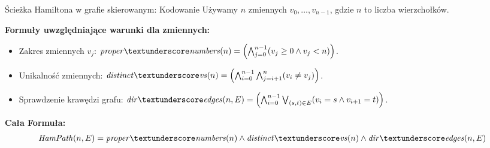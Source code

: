 \begin{frame}{Ścieżka Hamiltona w grafie skierowanym: Kodowanie}
Używamy $n$ zmiennych $v_0,…,v_{n−1}$, gdzie $n$ to liczba wierzchołków.
\vspace{10pt}

\textbf{Formuły uwzględniające warunki dla zmiennych:}
\vspace{5pt}
\begin{itemize}
	\item Zakres zmiennych $v_j$: $\propernumbers(n) = \left( \bigwedge_{j=0}^{n-1} (v_j \geq 0 \land v_j < n) \right) $.
	\item Unikalność zmiennych: $\distinctvs(n) = \left( \bigwedge_{i=0}^{n-1} \bigwedge_{j=i+1}^{n} (v_i \neq v_j) \right)$.
	\item Sprawdzenie krawędzi grafu: $\diredges(n,E) = \left( \bigwedge_{i=0}^{n-1} \bigvee_{(s,t) \in E} (v_i = s \land v_{i+1} = t) \right)$.
\end{itemize}
\vspace{10pt}
\textbf{Cała Formuła:}
\begin{align*}
	\HamPath(n, E) = \propernumbers(n) \land \distinctvs(n) \land \diredges(n, E)
\end{align*}
\end{frame}